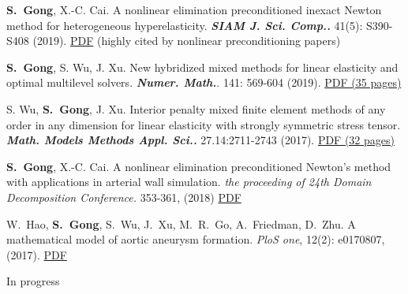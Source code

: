 \documentclass[letterpaper]{article}
\begin{document}
\begin{enumerate}[label={[\arabic*]},leftmargin=*]
  \item {\bf S.~Gong}, X.-C. Cai.   A nonlinear elimination preconditioned inexact Newton method for heterogeneous hyperelasticity.
   \emph{\bf SIAM J. Sci. Comp.. } 41(5): S390-S408 (2019). \href{https://doi.org/10.1137/18M1194936}{PDF} (highly cited by nonlinear preconditioning papers)
	
	

\item {\bf S.~Gong}, S. Wu, J. Xu.  New hybridized mixed methods for linear elasticity and optimal multilevel solvers. {\bf \emph{Numer. Math.}}. 141: 569-604 (2019). \href{https://doi.org/10.1007/s00211-018-1001-3}{PDF (35 pages)}
 
 

  
  

      




\item S. Wu, {\bf S.~Gong},  J. Xu.   Interior penalty mixed finite element methods of any order in any dimension for linear elasticity with strongly symmetric stress tensor.  {\bf\emph{Math. Models Methods Appl. Sci..}} 27.14:2711-2743 (2017). \href{https://doi.org/10.1142/S0218202517500567}{PDF (32 pages)}





\item    {\bf S.~Gong}, X.-C. Cai. A nonlinear elimination preconditioned Newton's method with applications in arterial wall simulation.  \emph{the proceeding of 24th Domain  Decomposition Conference.} 353-361, (2018) \href{https://link.springer.com/content/pdf/10.1007/978-3-319-93873-8_33.pdf}{PDF}


  




\item W.~Hao, {\bf S.~Gong}, S.~Wu, J.~Xu, M.~R.~Go, A.~Friedman,  D.~Zhu.  A mathematical model of aortic aneurysm formation.  \emph{PloS one}, 12(2): e0170807, (2017). \href{https://doi.org/10.1371/journal.pone.0170807}{PDF}



 

\hspace{-1cm} In progress





\end{enumerate}
\end{document}
